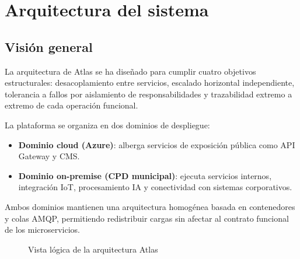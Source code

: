 \chapter{Arquitectura del sistema}
\label{cap:arquitectura}

\section{Visión general}

La arquitectura de Atlas se ha diseñado para cumplir cuatro objetivos estructurales: desacoplamiento entre servicios, escalado horizontal independiente, tolerancia a fallos por aislamiento de responsabilidades y trazabilidad extremo a extremo de cada operación funcional.

La plataforma se organiza en dos dominios de despliegue:

\begin{itemize}
\item \textbf{Dominio cloud (Azure)}: alberga servicios de exposición pública como API Gateway y CMS.
\item \textbf{Dominio on-premise (CPD municipal)}: ejecuta servicios internos, integración IoT, procesamiento IA y conectividad con sistemas corporativos.
\end{itemize}

Ambos dominios mantienen una arquitectura homogénea basada en contenedores y colas AMQP, permitiendo redistribuir cargas sin afectar al contrato funcional de los microservicios.

\begin{figure}[H]
\centering
{}
\caption{Vista lógica de la arquitectura Atlas}
\label{fig:arquitectura-general}
\end{figure}

